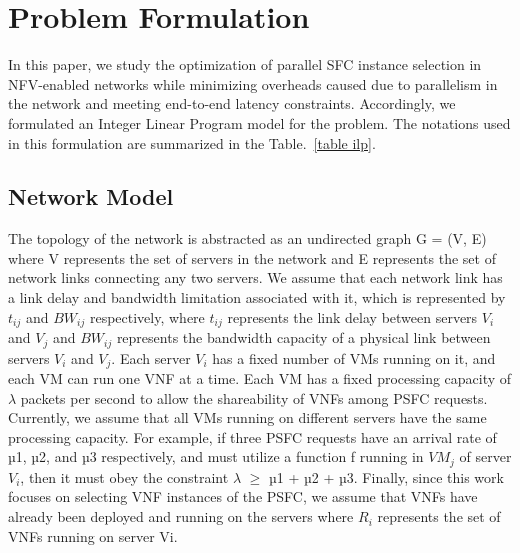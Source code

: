 \documentclass[journal]{IEEEtran}
\begin{document}
\section{Problem Formulation}
In this paper, we study the optimization of parallel SFC instance selection in NFV-enabled networks while minimizing overheads caused due to parallelism in the network and meeting end-to-end latency constraints. Accordingly, we formulated an Integer Linear Program model for the problem. The notations used in this formulation are summarized in the Table.~\ref{table ilp}.
\subsection{Network Model}
The topology of the network is abstracted as an undirected graph G = (V, E) where V represents the set of servers in the network and E represents the set of network links connecting any two servers. We assume that each network link has a link delay and bandwidth limitation associated with it, which is represented by $t_{ij}$ and $BW_{ij}$ respectively, where $t_{ij}$ represents the link delay between servers $V_{i}$ and $V_{j}$ and $BW_{ij}$ represents the bandwidth capacity of a physical link between servers $V_{i}$ and $V_{j}$. Each server $V_{i}$ has a fixed number of VMs running on it, and each VM can run one VNF at a time. Each VM has a fixed processing capacity of $\lambda$ packets per second to allow the shareability of VNFs among PSFC requests. Currently, we assume that all VMs running on different servers have the same processing capacity. For example, if three PSFC requests have an arrival rate of µ1, µ2, and µ3 respectively, and must utilize a function f running in $VM_j$ of server $V_{i}$, then it must obey the constraint $\lambda$ $\geq$ µ1 + µ2 + µ3. Finally, since this work focuses on selecting VNF instances of the PSFC, we assume that VNFs have already been deployed and running on the servers where $R_i$ represents the set of VNFs running on server Vi.
\end{document}
